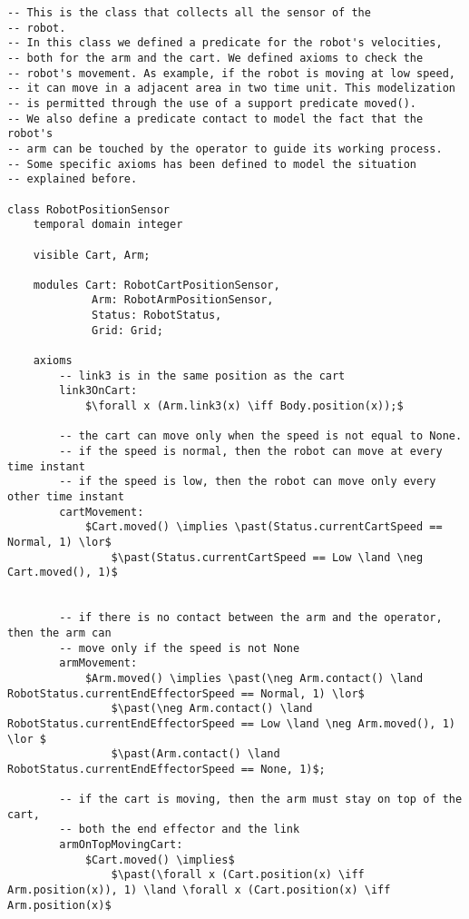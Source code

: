 \begin{lstlisting}[fontadjust, mathescape, frame=single] 
-- This is the class that collects all the sensor of the
-- robot.
-- In this class we defined a predicate for the robot's velocities,
-- both for the arm and the cart. We defined axioms to check the
-- robot's movement. As example, if the robot is moving at low speed,
-- it can move in a adjacent area in two time unit. This modelization
-- is permitted through the use of a support predicate moved().
-- We also define a predicate contact to model the fact that the robot's
-- arm can be touched by the operator to guide its working process.
-- Some specific axioms has been defined to model the situation
-- explained before.

class RobotPositionSensor
    temporal domain integer

    visible Cart, Arm;

    modules Cart: RobotCartPositionSensor,
             Arm: RobotArmPositionSensor,
             Status: RobotStatus,
             Grid: Grid;

    axioms
        -- link3 is in the same position as the cart
        link3OnCart: 
            $\forall x (Arm.link3(x) \iff Body.position(x));$

        -- the cart can move only when the speed is not equal to None.
        -- if the speed is normal, then the robot can move at every time instant
        -- if the speed is low, then the robot can move only every other time instant
        cartMovement:
            $Cart.moved() \implies \past(Status.currentCartSpeed == Normal, 1) \lor$
                $\past(Status.currentCartSpeed == Low \land \neg Cart.moved(), 1)$
            

        -- if there is no contact between the arm and the operator, then the arm can
        -- move only if the speed is not None
        armMovement:
            $Arm.moved() \implies \past(\neg Arm.contact() \land RobotStatus.currentEndEffectorSpeed == Normal, 1) \lor$
                $\past(\neg Arm.contact() \land RobotStatus.currentEndEffectorSpeed == Low \land \neg Arm.moved(), 1) \lor $
                $\past(Arm.contact() \land RobotStatus.currentEndEffectorSpeed == None, 1)$;

        -- if the cart is moving, then the arm must stay on top of the cart,
        -- both the end effector and the link
        armOnTopMovingCart: 
            $Cart.moved() \implies$
                $\past(\forall x (Cart.position(x) \iff Arm.position(x)), 1) \land \forall x (Cart.position(x) \iff Arm.position(x)$


\end{lstlisting}
